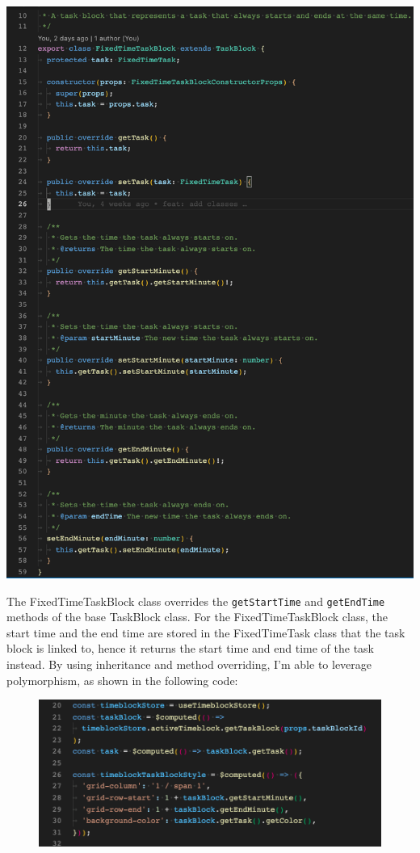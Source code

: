 \documentclass[notitlepage, 12pt]{report}
\newcommand{\code}[1]{\texttt{#1}}
\begin{document}
\includegraphics[width=1\textwidth]{inheritance.png}

The FixedTimeTaskBlock class overrides the \code{getStartTime} and \code{getEndTime} methods of the base TaskBlock class. For the FixedTimeTaskBlock class, the start time and the end time are stored in the FixedTimeTask class that the task block is linked to, hence it returns the start time and end time of the task instead. By using inheritance and method overriding, I'm able to leverage polymorphism, as shown in the following code:

\begin{figure}[H]
	\includegraphics[width=1\textwidth]{polymorphism.png}
\end{figure}
\end{document}
